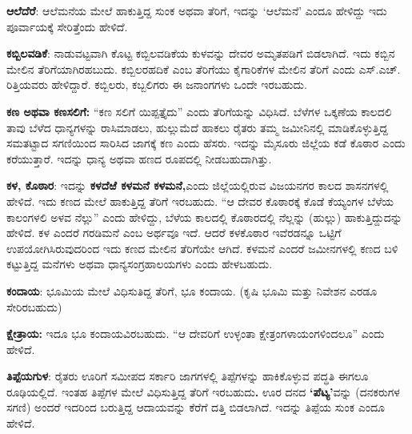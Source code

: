 \textbf{ಆಲೆದೆರೆ}: ಆಲೆಮನೆಯ ಮೇಲೆ ಹಾಕುತ್ತಿದ್ದ ಸುಂಕ ಅಥವಾ ತೆರಿಗೆ, ಇದನ್ನು ‘ಆಲೆಮನೆ’ ಎಂದೂ ಹೇಳಿದ್ದು ಇದು ಪೂರ್ವಾಯಕ್ಕೆ ಸೇರಿತ್ತೆಂದು ಹೇಳಿದೆ.

\textbf{ಕಬ್ಬಿಲವಡಿಕೆ}: ನಾಡುವಟ್ಟವಾಗಿ ಕೊಟ್ಟ ಕಬ್ಬಿಲವಡಿಕೆಯ ಕುಳವನ್ನು ದೇವರ ಅಮೃತಪಡಿಗೆ ಬಿಡಲಾಗಿದೆ. ಇದು ಕಬ್ಬಿನ ಮೇಲಿನ ತೆರಿಗೆಯಾಗಿರಹಬುದು. ಕಬ್ಬಿಲರಹದಿಕೆ ಎಂಬ ತೆರಿಗೆಯು ಕೈಗಾರಿಕೆಗಳ ಮೇಲಿನ ತೆರಿಗೆ ಎಂದು ಎಸ್​.ಎಚ್​. ರಿತ್ತಿಯವರು ಹೇಳಿದ್ದಾರೆ. ಕಬ್ಬಿಲರು, ಕಬ್ಬಲಿಗರು ಈ ಜನಾಂಗಗಳು ಒಂದೇ ಇರಬಹುದು.

\textbf{ಕಣ ಅಥವಾ ಕಣಸಲಿಗೆ:} “ಕಣ ಸಲಿಗೆ ಯಿಪ್ಪತ್ತೈದು” ಎಂದು ತೆರಿಗೆಯನ್ನು ವಿಧಿಸಿದೆ. ಬೆಳೆಗಳ ಒಕ್ಕಣೆಯ ಕಾಲದಲಿ ತಾವು ಬೆಳೆದ ಧಾನ್ಯಗಳನ್ನು ರಾಸಿಮಾಡಲು, ಹುಲ್ಲುಮೆದೆ ಹಾಕಲು ರೈತರು ತಮ್ಮ ಜಮೀನಿನಲ್ಲಿ ಮಾಡಿಕೊಳ್ಳುತ್ತಿದ್ದ ಸಮತಟ್ಟಾದ ಸಗಣಿಯಿಂದ ಸಾರಿಸಿದ ಜಾಗಕ್ಕೆ ಕಣ ಎಂದು ಹೆಸರು. ಇದನ್ನು ಮೈಸೂರು ಜಿಲ್ಲೆಯ ಕಡೆ ಕೊಠಾರ ಎಂದು ಕರೆಯುತ್ತಾರೆ. ಇದನ್ನು ಧಾನ್ಯ ಅಥವಾ ಹಣದ ರೂಪದಲ್ಲಿ ನೀಡಬಹುದಾಗಿತ್ತು.

 \textbf{ಕಳ, ಕೊಠಾರ}: ಇದನ್ನು \textbf{ಕಳದೆಱೆ ಕಳಮನೆ ಕಳಮನೆ,}ಎಂದು ಜಿಲ್ಲೆಯಲ್ಲಿರುವ ವಿಜಯನಗರ ಕಾಲದ ಶಾಸನಗಳಲ್ಲಿ ಹೇಳಿದೆ. ಇದು ಕಣದ ಮೇಲೆ ಹಾಕುತ್ತಿದ್ದ ತೆರಿಗೆ ಇರಬಹುದು. “ಆ ದೇವರ ಕೊಠಾರಕ್ಕೆ ಕೊಡೆ ಕೆಯ್ಯಂಗಳ ಬೆಳೆಯ ಕಾಲಂಗಳಲಿ ಅಳವ ನೆಲ್ಲು” ಎಂದು ಹೇಳಿದ್ದು, ಬೆಳೆಯ ಕಾಲದಲ್ಲಿ ಕೊಠಾರದಲ್ಲಿ ನೆಲ್ಲನ್ನು (ಹುಲ್ಲು) ಹಾಕುತ್ತಿದ್ದುದನ್ನು ಹೇಳಿದೆ. ಕಳ ಎಂದರೆ ಗರಡಿಮನೆ ಎಂಬ ಅರ್ಥವೂ ಇದೆ. ಆದರೆ ಕಳಕೊಠಾರ ಇವೆರಡನ್ನೂ ಒಟ್ಟಿಗೆ ಉಪಯೋಗಿಸಿರುವುದರಿಂದ ಇದು ಕಣದ ಮೇಲಿನ ತೆರಿಗೆಯೇ ಆಗಿದೆ. ಕಳಮನೆ ಎಂದರೆ ಜಮೀನಗಳಲ್ಲಿ ಕಣದ ಬಳಿ ಕಟ್ಟುತ್ತಿದ್ದ ಮನೆಗಳು ಅಥವಾ ಧಾನ್ಯಸಂಗ್ರಹಾಲಯಗಳು ಎಂದು ಹೇಳಬಹುದು.

\textbf{ಕಂದಾಯ}: ಭೂಮಿಯ ಮೇಲೆ ವಿಧಿಸುತಿದ್ದ ತೆರಿಗೆ, ಭೂ ಕಂದಾಯ. (ಕೃಷಿ ಭೂಮಿ ಮತ್ತು ನಿವೇಶನ ಎರಡೂ ಸೇರಿರಬಹುದು)

\textbf{ಕ್ಷೇತ್ರಾಯ: } ಇದೂ ಭೂ ಕಂದಾಯವಿರಬಹುದು. “ಆ ದೇವರಿಗೆ ಉಳ್ಳಂತಾ ಕ್ಷೇತ್ರಂಗಳಾಯಂಗಳಿಂದಲೂ” ಎಂದು ಹೇಳಿದೆ.

\textbf{ತಿಪ್ಪೆಯಗುಳ}: ರೈತರು ಊರಿಗೆ ಸಮೀಪದ ಸರ್ಕಾರಿ ಜಾಗಗಳಲ್ಲಿ ತಿಪ್ಪೆಗಳನ್ನು ಹಾಕಿಕೊಳ್ಳುವ ಪದ್ಧತಿ ಈಗಲೂ ರೂಢಿಯಲ್ಲಿದೆ. ಇಂತಹ ತಿಪ್ಪೆಗಳ ಮೇಲೆ ವಿಧಿಸುತ್ತಿದ್ದ ತೆರಿಗೆ ಇರಬಹುದು\textbf{.} ಊರ ದನದ \textbf{‘ಪೆಟ್ಯ’}ವನ್ನು (ದನಕರುಗಳ ಸಗಣಿ) ಅಂದರೆ ಇದರಿಂದ ಬರುತ್ತಿದ್ದ ಆದಾಯವನ್ನು ಕೆರೆಗೆ ದತ್ತಿ ಬಿಡಲಾಗಿದೆ. ಇದನ್ನು ತಿಪ್ಪೆಯ ಸುಂಕ ಎಂದೂ ಹೇಳಿದೆ.

